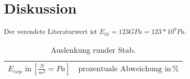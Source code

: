 \section{Diskussion}
\label{sec:Diskussion}
Der verendete Literaturwert ist $E_{lit} = 123 GPa = 123*10^9 Pa$\cite{litval}.
\begin{table}[h]
  \centering
  \label{tab:lit3}
  \begin{tabular}{ c c  }
    \toprule
    $E_{exp} \,\, \text{in} \, [\frac{N}{m^2}= Pa]$
   &{$\text{prozentuale Abweichung}\,\, \text{in} \, \% $} \\

    \midrule


    \bottomrule
  \end{tabular}
  \caption{Auslenkung runder Stab.}
\end{table}
